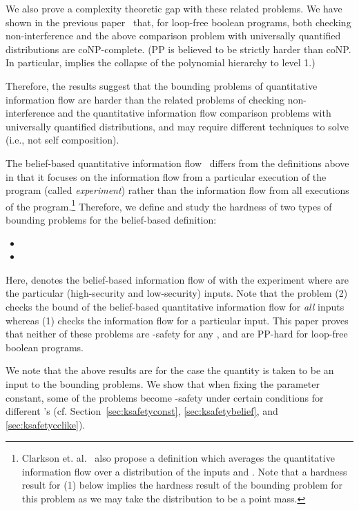 \documentclass{llncs}
\begin{document}
We also prove a complexity theoretic gap with these related problems.
We have shown in the previous paper~\cite{DBLP:conf/csfw/yasuoka2010}
that, for loop-free boolean programs, both checking non-interference
and the above comparison problem with universally quantified
distributions are coNP-complete.  (PP is believed to be strictly
harder than coNP.  In particular,  implies
the collapse of the polynomial hierarchy to level 1.)

Therefore, the results suggest that the bounding problems of
quantitative information flow are harder than the related problems of
checking non-interference and the quantitative information flow
comparison problems with universally quantified distributions, and may
require different techniques to solve (i.e., not self composition).

The belief-based quantitative information flow~\cite{clarkson:csf2005}
differs from the definitions above in that it focuses on the
information flow from a particular execution of the program (called
{\em experiment}) rather than the information flow from all executions
of the program.\footnote{Clarkson et. al.~\cite{clarkson:csf2005}
    also propose a definition which averages the quantitative
    information flow over a distribution of the inputs  and .
    Note that a hardness result for (1) below implies the hardness
    result of the bounding problem for this problem as we may take the
    distribution to be a point mass.}  Therefore, we define and study
the hardness of two types of bounding problems for the belief-based
definition:
\begin{itemize}
\item[(1)] 
\item[(2)] 
\end{itemize}
Here,  denotes the belief-based
information flow of  with the experiment  where
 are the particular (high-security and low-security) inputs.
Note that the problem (2) checks the bound of the belief-based
quantitative information flow for {\em all} inputs whereas (1) checks
the information flow for a particular input.  This paper proves that
neither of these problems are -safety for any , and are PP-hard
for loop-free boolean programs.

We note that the above results are for the case the quantity  is
taken to be an input to the bounding problems.  We show that when
fixing the parameter  constant, some of the problems become
-safety under certain conditions for different 's
(cf. Section~\ref{sec:ksafetyconst}, \ref{sec:ksafetybelief}, and
\ref{sec:ksafetycclike}).
\end{document}
